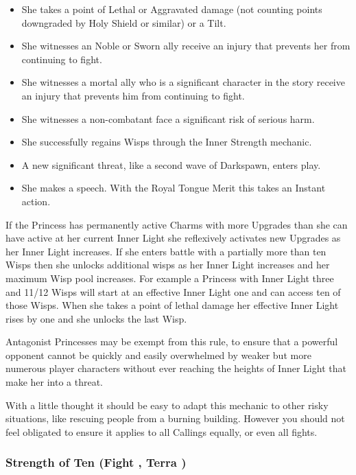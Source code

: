  \begin{itemize}
 \item She takes a point of Lethal or Aggravated damage (not counting points downgraded by Holy Shield or similar) or a Tilt.
 \item She witnesses an Noble or Sworn ally receive an injury that prevents her from continuing to fight.
 \item She witnesses a mortal ally who is a significant character in the story receive an injury that prevents him from continuing to fight.
 \item She witnesses a non-combatant face a significant risk of serious harm.
 \item She successfully regains Wisps through the Inner Strength mechanic. 
 \item A new significant threat, like a second wave of Darkspawn, enters play. 
 \item She makes a speech. With the Royal Tongue Merit this takes an Instant action. 
 \end{itemize}
 
 If the Princess has permanently active Charms with more Upgrades than she can have active at her current Inner Light she reflexively activates new Upgrades as her Inner Light increases. If she enters battle with a partially more than ten Wisps then she unlocks additional wisps as her Inner Light increases and her maximum Wisp pool increases. For example a Princess with Inner Light three and 11/12 Wisps will start at an effective Inner Light one and can access ten of those Wisps. When she takes a point of lethal damage her effective Inner Light rises by one and she unlocks the last Wisp. 
 
 Antagonist Princesses may be exempt from this rule, to ensure that a powerful opponent cannot be quickly and easily overwhelmed by weaker but more numerous player characters without ever reaching the heights of Inner Light that make her into a threat.  
 
 With a little thought it should be easy to adapt this mechanic to other risky situations, like rescuing people from a burning building. However you should not feel obligated to ensure it applies to all Callings equally, or even all fights. 
 
\bigsidebarend

\subsubsection*{Strength of Ten (Fight \textbullet\textbullet\textbullet\textbullet\textbullet, Terra \textbullet\textbullet\textbullet)}

